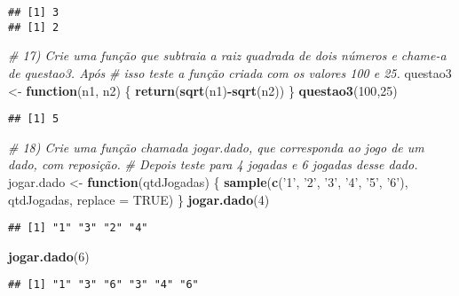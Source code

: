 \documentclass[]{article}
\newenvironment{Shaded}{\begin{snugshade}}{\end{snugshade}}
\newcommand{\CommentTok}[1]{\textcolor[rgb]{0.56,0.35,0.01}{\textit{#1}}}
\newcommand{\ControlFlowTok}[1]{\textcolor[rgb]{0.13,0.29,0.53}{\textbf{#1}}}
\newcommand{\DataTypeTok}[1]{\textcolor[rgb]{0.13,0.29,0.53}{#1}}
\newcommand{\DecValTok}[1]{\textcolor[rgb]{0.00,0.00,0.81}{#1}}
\newcommand{\KeywordTok}[1]{\textcolor[rgb]{0.13,0.29,0.53}{\textbf{#1}}}
\newcommand{\NormalTok}[1]{#1}
\newcommand{\OperatorTok}[1]{\textcolor[rgb]{0.81,0.36,0.00}{\textbf{#1}}}
\newcommand{\OtherTok}[1]{\textcolor[rgb]{0.56,0.35,0.01}{#1}}
\newcommand{\StringTok}[1]{\textcolor[rgb]{0.31,0.60,0.02}{#1}}
\begin{document}
\begin{verbatim}
## [1] 3
## [1] 2
\end{verbatim}

\begin{Shaded}
\begin{Highlighting}[]
\CommentTok{# 17) Crie uma função que subtraia a raiz quadrada de dois números e chame-a de questao3. Após}
\CommentTok{# isso teste a função criada com os valores 100 e 25.}
\NormalTok{questao3 <-}\StringTok{ }\ControlFlowTok{function}\NormalTok{(n1, n2)}
\NormalTok{\{}
  \KeywordTok{return}\NormalTok{(}\KeywordTok{sqrt}\NormalTok{(n1)}\OperatorTok{-}\KeywordTok{sqrt}\NormalTok{(n2))}
\NormalTok{\}}
\KeywordTok{questao3}\NormalTok{(}\DecValTok{100}\NormalTok{,}\DecValTok{25}\NormalTok{)}
\end{Highlighting}
\end{Shaded}

\begin{verbatim}
## [1] 5
\end{verbatim}

\begin{Shaded}
\begin{Highlighting}[]
\CommentTok{# 18) Crie uma função chamada jogar.dado, que corresponda ao jogo de um dado, com reposição.}
\CommentTok{# Depois teste para 4 jogadas e 6 jogadas desse dado.}
\NormalTok{jogar.dado <-}\StringTok{ }\ControlFlowTok{function}\NormalTok{(qtdJogadas)}
\NormalTok{\{}
  \KeywordTok{sample}\NormalTok{(}\KeywordTok{c}\NormalTok{(}\StringTok{'1'}\NormalTok{, }\StringTok{'2'}\NormalTok{, }\StringTok{'3'}\NormalTok{, }\StringTok{'4'}\NormalTok{, }\StringTok{'5'}\NormalTok{, }\StringTok{'6'}\NormalTok{), qtdJogadas, }\DataTypeTok{replace =} \OtherTok{TRUE}\NormalTok{)}
\NormalTok{\}}
\KeywordTok{jogar.dado}\NormalTok{(}\DecValTok{4}\NormalTok{)}
\end{Highlighting}
\end{Shaded}

\begin{verbatim}
## [1] "1" "3" "2" "4"
\end{verbatim}

\begin{Shaded}
\begin{Highlighting}[]
\KeywordTok{jogar.dado}\NormalTok{(}\DecValTok{6}\NormalTok{)}
\end{Highlighting}
\end{Shaded}

\begin{verbatim}
## [1] "1" "3" "6" "3" "4" "6"
\end{verbatim}
\end{document}
